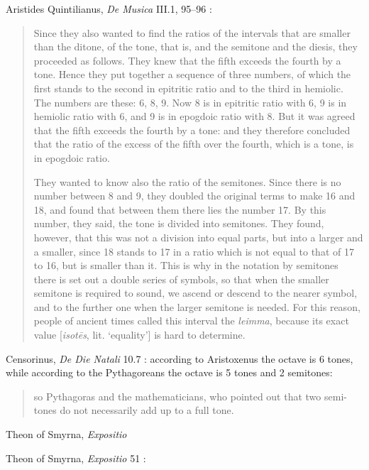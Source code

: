 \documentclass{article}
\theoremstyle{definition}
\begin{document}
Aristides Quintilianus, {\em De Musica} III.1, 95--96 \cite[pp.~495--496]{barker}: 

\begin{quote}
Since they also wanted to find the ratios of the intervals that are smaller than
the ditone, of the tone, that is, and the semitone and the diesis, they proceeded
as follows. They knew that the fifth exceeds the fourth by a tone. Hence they
put together a sequence of three numbers, of which the first stands to the
second in epitritic ratio and to the third in hemiolic. The numbers are these:
6, 8, 9. Now 8 is in epitritic ratio with 6, 9 is in hemiolic ratio with 6, and 9
is in epogdoic ratio with 8. But it was agreed that the fifth exceeds the fourth
by a tone: and they therefore concluded that the ratio of the excess of the fifth
over the fourth, which is a tone, is in epogdoic ratio.

They wanted to know also the ratio of the semitones. Since there is no
number between 8 and 9, they doubled the original terms to make 16 and 18,
and found that between them there lies the number 17. By this number, they
said, the tone is divided into semitones. They found, however, that this was not
a division into equal parts, but into a larger and a smaller, since 18 stands to
17 in a ratio which is not equal to that of 17 to 16, but is smaller than it. This
is why in the notation by semitones there is set out a double series of symbols,
so that when the smaller semitone is required to sound, we ascend or descend
to the nearer symbol, and to the further one when the larger semitone is needed.
For this reason, people of ancient times called this interval the {\em leimma}, because
its exact value [{\em isot\={e}s}, lit. `equality'] is hard to determine.
\end{quote}

Censorinus, {\em De Die Natali} 10.7 \cite[p.~18]{censorinus}: according to Aristoxenus the octave is 6 tones, while
according to the Pythagoreans the octave is 5 tones and 2 semitones:

\begin{quote}
so Pythagoras and the mathematicians, who pointed
out that two semi-tones do not necessarily add up to a full tone.
\end{quote}

Theon of Smyrna, {\em Expositio} \cite{dupuis}

Theon of Smyrna, {\em Expositio} 51 \cite[pp.~214--215]{barker}:
\end{document}
